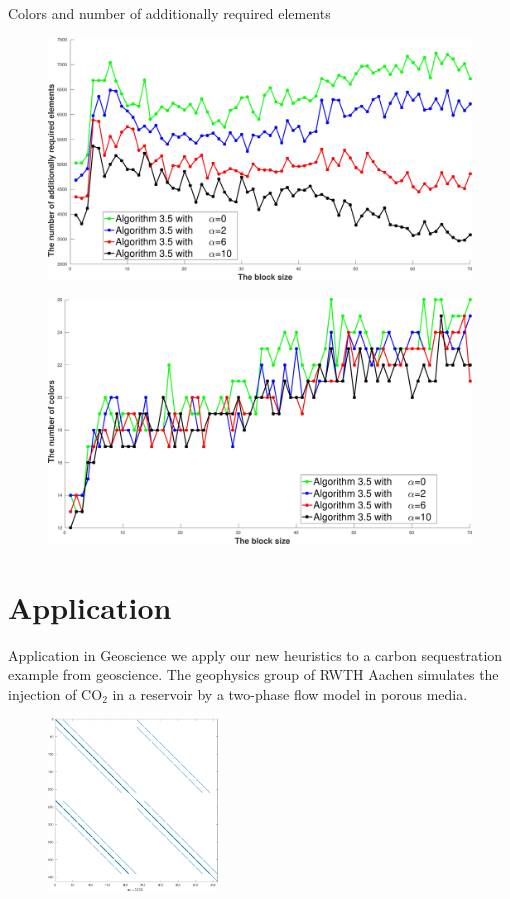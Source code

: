 \documentclass{beamer}
\begin{document}
\begin{frame}{Colors and number of additionally required elements}
\begin{figure}
\centering
\includegraphics[width=0.5\linewidth]{ex33_alg35_alpha_0_2_6_10_bls_lfo_adds}
\end{figure}

\begin{figure}
\centering
\includegraphics[width=0.5\linewidth]{ex33_alg35_alpha_0_2_6_10_bls_lfo_cols}
\end{figure}
\end{frame}

\section{Application}
\begin{frame}{Application in Geoscience}
we apply our new heuristics to a carbon sequestration example from geoscience.
The geophysics group of RWTH Aachen simulates the injection of CO$_2$ in a reservoir by a
two-phase flow model in porous media.
\begin{figure}
\centering
\includegraphics[width=0.4\textwidth]{co2_jac}
\end{figure}
\end{frame}
\end{document}
